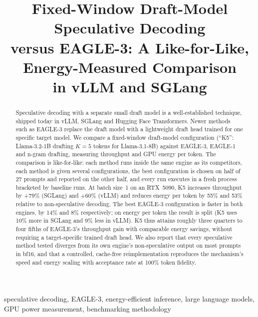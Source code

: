 \documentclass[conference]{IEEEtran}
\begin{document}
\title{Fixed-Window Draft-Model Speculative Decoding \\ versus EAGLE-3:
A Like-for-Like, Energy-Measured Comparison \\ in vLLM and SGLang}

\author{
}

\maketitle

\begin{abstract}
Speculative decoding with a separate small draft model is a well-established
technique, shipped today in vLLM, SGLang and Hugging Face Transformers. Newer
methods such as EAGLE-3 replace the draft model with a lightweight draft head
trained for one specific target model. We compare a fixed-window draft-model
configuration (``K5'': Llama-3.2-1B drafting $K{=}5$ tokens for
Llama-3.1-8B) against EAGLE-3, EAGLE-1 and n-gram drafting, measuring
throughput and GPU energy per token. The comparison is like-for-like: each
method runs inside the same engine as its competitors, each method is given
several configurations, the best configuration is chosen on half of 27
prompts and reported on the other half, and every run executes in a fresh
process bracketed by baseline runs. At batch size~1 on an RTX~5090, K5
increases throughput by +79\% (SGLang) and +60\% (vLLM) and reduces energy
per token by 55\% and 53\% relative to non-speculative decoding. The best
EAGLE-3 configuration is faster in both engines, by 14\% and 8\%
respectively; on energy per token the result is split (K5 uses 10\% more in
SGLang and 9\% less in vLLM). K5 thus attains roughly three quarters to four
fifths of EAGLE-3's throughput gain with comparable energy savings, without
requiring a target-specific trained draft head. We also report that every
speculative method tested diverges from its own engine's non-speculative
output on most prompts in bf16, and that a controlled, cache-free
reimplementation reproduces the mechanism's speed and energy scaling with
acceptance rate at 100\% token fidelity.
\end{abstract}

\begin{IEEEkeywords}
speculative decoding, EAGLE-3, energy-efficient inference, large language models, GPU power measurement, benchmarking methodology
\end{IEEEkeywords}
\end{document}
